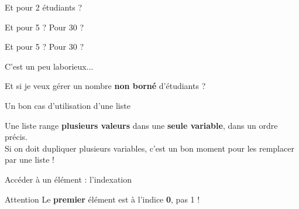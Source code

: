 \documentclass{beamer}
\begin{document}
\begin{frame}{Et pour 2 étudiants ?}
	

	\pause
	\begin{center}
		\Large Et pour 5 ? Pour 30 ?
	\end{center}
\end{frame}

\begin{frame}{Et pour 5 ? Pour 30 ?}
	

	\pause
	\begin{center}
		\Large C'est un peu laborieux...
	\end{center}

	\pause
	\begin{center}
		\Large Et si je veux gérer un nombre \textbf{non borné} d'étudiants ?
	\end{center}
\end{frame}

\begin{frame}{Un bon cas d'utilisation d'une liste}
	

	\vspace{0.3cm}
	\begin{center}
		Une liste range \textbf{plusieurs valeurs} dans une \textbf{seule variable}, dans un ordre précis.\\
		Si on doit dupliquer plusieurs variables, c'est un bon moment pour les remplacer par une liste !
	\end{center}
\end{frame}

\begin{frame}{Accéder à un élément : l'indexation}
	

	\vspace{0.3cm}
	\begin{center}
	\end{center}

	\pause
	\begin{alertblock}{Attention}
		\centering Le \textbf{premier} élément est à l'indice \textbf{0}, pas 1 !
	\end{alertblock}
\end{frame}
\end{document}

